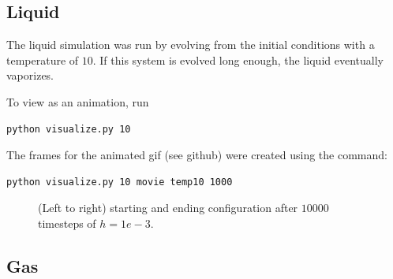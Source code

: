 \documentclass[12pt]{article}
\begin{document}
\subsection{Liquid}

The liquid simulation was run by evolving from the initial conditions with a
temperature of $10$. If this system is evolved long enough, the liquid
eventually vaporizes.

To view as an animation, run

\begin{verbatim}
python visualize.py 10
\end{verbatim}

The frames for the animated gif (see github) were created using the command:

\begin{verbatim}
python visualize.py 10 movie temp10 1000
\end{verbatim}

\begin{figure}[H]
  \caption{(Left to right) starting and ending configuration after $10000$
    timesteps of $h = 1e-3$.}
\end{figure}

\subsection{Gas}
\end{document}

